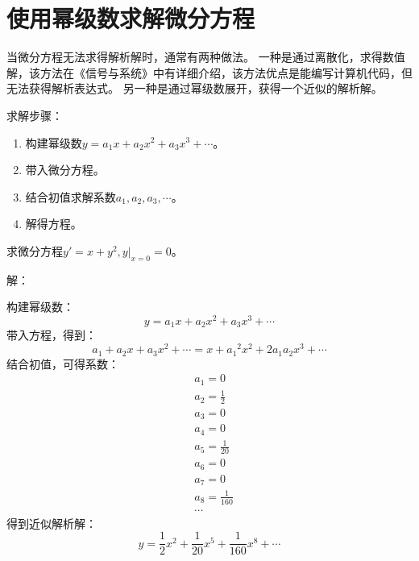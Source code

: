 \section{使用幂级数求解微分方程}

当微分方程无法求得解析解时，通常有两种做法。
一种是通过离散化，求得数值解，该方法在《信号与系统》中有详细介绍，该方法优点是能编写计算机代码，但无法获得解析表达式。
另一种是通过幂级数展开，获得一个近似的解析解。

求解步骤：
\begin{enumerate}
    \item 构建幂级数$y=a_1x+a_2x^2+a_3x^3+\cdots $。
    \item 带入微分方程。
    \item 结合初值求解系数$a_1,a_2,a_3,\cdots $。
    \item 解得方程。
\end{enumerate}

\begin{example}
求微分方程$y'=x+y^2,\left. y \right|_{x=0}=0$。
\end{example}

解：

构建幂级数：
\[
y=a_1x+a_2x^2+a_3x^3+\cdots
\]
带入方程，得到：
\[
a_1+a_2x+a_3x^2+\cdots =x+{a_1}^2x^2+2a_1a_2x^3+\cdots
\]
结合初值，可得系数：
\begin{align*}
&a_1=0 \\
&a_2=\frac{1}{2} \\
&a_3=0 \\
&a_4=0 \\
&a_5=\frac{1}{20} \\
&a_6=0 \\
&a_7=0 \\
&a_8=\frac{1}{160} \\
&\cdots
\end{align*}
得到近似解析解：
\[
y=\frac{1}{2}x^2+\frac{1}{20}x^5+\frac{1}{160}x^8+\cdots
\]




